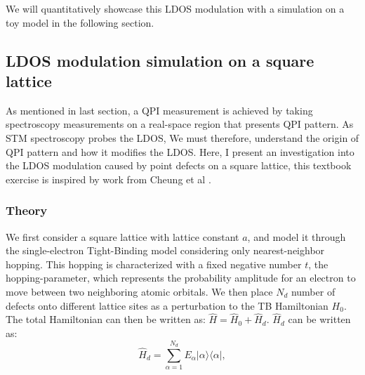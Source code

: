 We will quantitatively showcase this \ac{LDOS} modulation with a simulation on a toy model in the following section. 


\subsection{LDOS modulation simulation on a square lattice}

As mentioned in last section, a \ac{QPI} measurement is achieved by taking spectroscopy measurements on a real-space region that presents QPI pattern. As \ac{STM} spectroscopy probes the \ac{LDOS}, We must therefore, understand the origin of \ac{QPI} pattern and how it modifies the \ac{LDOS}. Here, I present an investigation into the \ac{LDOS} modulation caused by point defects on a square lattice, this textbook exercise is inspired by work from Cheung et al \cite{cheungDictionaryLearningFouriertransform2020}.

\subsubsection{Theory}

We first consider a square lattice with lattice constant $a$, and model it through the single-electron Tight-Binding model considering only nearest-neighbor hopping. This hopping is characterized with a fixed negative number $t$, the hopping-parameter, which represents the probability amplitude for an electron to move between two neighboring atomic orbitals. We then place $N_d$ number of defects onto different lattice sites as a perturbation to the \ac{TB} Hamiltonian $H_0$. The total Hamiltonian can then be written as: 
$\hat{H} = \hat{H}_0 + \hat{H}_d$. $\hat{H}_d$ can be written as: 
\begin{equation}
\label{eq:defect_hamiltonian}
\hat{H}_d = \sum_{\alpha=1}^{N_d} E_\alpha \lvert \alpha \rangle \langle \alpha \rvert,	
\end{equation}

